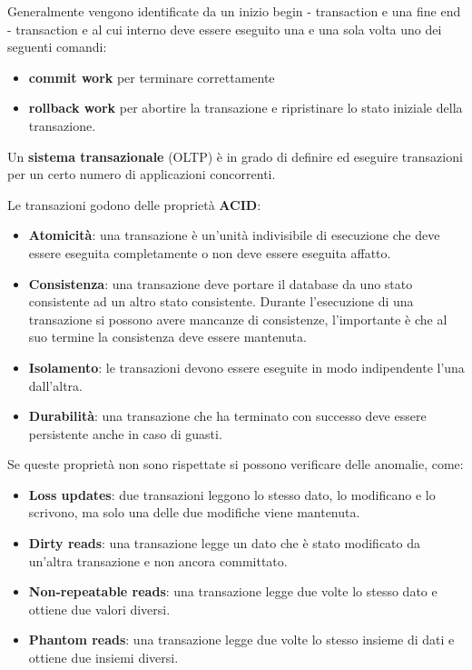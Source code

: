 Generalmente vengono identificate da un inizio begin - transaction e una fine
end - transaction e al cui interno deve essere eseguito una e una sola
volta uno dei seguenti comandi:
\begin{itemize}
      \item \textbf{commit work} per terminare correttamente
      \item \textbf{rollback work} per abortire la transazione e ripristinare lo
            stato iniziale della transazione.
\end{itemize}
Un \textbf{sistema transazionale} (OLTP) è in grado di definire ed eseguire
transazioni per un certo numero di applicazioni concorrenti.

Le transazioni godono delle proprietà \textbf{ACID}:
\begin{itemize}
      \item \textbf{Atomicità}: una transazione è un'unità indivisibile di
            esecuzione che deve essere eseguita completamente o non deve essere
            eseguita affatto.
      \item \textbf{Consistenza}: una transazione deve portare il database da uno
            stato consistente ad un altro stato consistente. Durante l'esecuzione
            di una transazione si possono avere mancanze di consistenze, l'importante
            è che al suo termine la consistenza deve essere mantenuta.
      \item \textbf{Isolamento}: le transazioni devono essere eseguite in modo
            indipendente l'una dall'altra.
      \item \textbf{Durabilità}: una transazione che ha terminato con successo
            deve essere persistente anche in caso di guasti.
\end{itemize}
Se queste proprietà non sono rispettate si possono verificare delle anomalie,
come:
\begin{itemize}
      \item \textbf{Loss updates}: due transazioni leggono lo stesso
            dato, lo modificano e lo scrivono, ma solo una delle due modifiche
            viene mantenuta.
      \item \textbf{Dirty reads}: una transazione legge un dato che è stato
            modificato da un'altra transazione e non ancora committato.
      \item \textbf{Non-repeatable reads}: una transazione legge due
            volte lo stesso dato e ottiene due valori diversi.
      \item \textbf{Phantom reads}: una transazione legge due volte lo stesso
            insieme di dati e ottiene due insiemi diversi.
\end{itemize}

